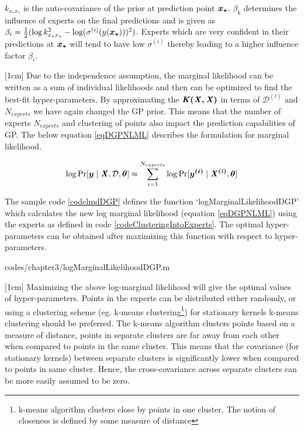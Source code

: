 $k_{x_{*}x_{*}}$ is the auto-covariance of the prior at prediction point $\boldsymbol{x_{*}}$. $\beta_{k}$ determines the influence of experts on the final predictions \cite{caoF14} and is given as $\beta_{i} = \frac{1}{2}(\log k_{x_{*}x_{*}}^{2} - \log(\sigma^{(i)}(y(\boldsymbol{x_{*}})))^{2})$. Experts which are very confident in their predictions at $\boldsymbol{x_{*}}$ will tend to have low $\sigma^{(i)}$ thereby leading to a higher influence factor $\beta_{i}$.

[1cm]
Due to the independence assumption, the marginal likelihood can be written as a sum of individual likelihoods and then can be optimized to find the best-fit hyper-parameters. By approximating the $\bm{\mathit{K(X, X)}}$ in terms of $\mathcal{D}^{(i)}$ and $N_{experts}$ we have again changed the GP prior. This means that the number of experts $N_{experts}$ and clustering of points also impact the prediction capabilities of GP. The below equation \ref{eqDGPNLML} describes the formulation for marginal likelihood. 

\begin{align}\label{eqDGPNLML}
    \log \Pr[\boldsymbol{y} \mid \bm{\mathit{X}}, \mathcal{D}, \boldsymbol{\theta}] \approx \sum_{i=1}^{N_{experts}} \log \Pr[\boldsymbol{y^{(i)}}\mid \bm{\mathit{X^{(i)}}}, \boldsymbol{\theta}]
 \end{align}

The sample code \ref{codelmdDGP} defines the function `logMarginalLikelihoodDGP' which calculates the new log marginal likelihood (equation \ref{eqDGPNLML}) using the experts as defined in code \ref{codeClusteringIntoExperts}. The optimal hyper-parameters can be obtained after maximizing this function with respect to hyper-parameters. 

\begin{mdframed}[hidealllines=true,backgroundcolor=lightgray!20]

                    {codes/chapter3/logMarginalLikelihoodDGP.m}
\end{mdframed}

[1cm]
Maximizing the above log-marginal likelihood will give the optimal values of hyper-parameters. Points in the experts can be distributed either randomly, or using a clustering scheme (eg. k-means clustering\footnote{k-means algorithm clusters close by points in one cluster. The notion of closeness is defined by some measure of distance}) for stationary kernels k-means clustering should be preferred. The k-means algorithm clusters points based on a measure of distance, points in separate clusters are far away from each other when compared to points in the same cluster. This means that the covariance (for stationary kernels) between separate clusters is significantly lower when compared to points in same cluster. Hence, the cross-covariance across separate clusters can be more easily assumed to be zero.

